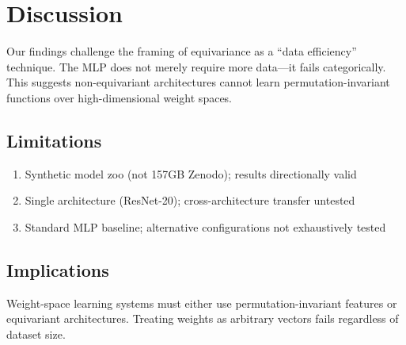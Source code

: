 \section{Discussion}

Our findings challenge the framing of equivariance as a ``data efficiency'' technique. The MLP does not merely require more data---it fails categorically. This suggests non-equivariant architectures cannot learn permutation-invariant functions over high-dimensional weight spaces.

\subsection{Limitations}

\begin{enumerate}
    \item Synthetic model zoo (not 157GB Zenodo); results directionally valid
    \item Single architecture (ResNet-20); cross-architecture transfer untested
    \item Standard MLP baseline; alternative configurations not exhaustively tested
\end{enumerate}

\subsection{Implications}

Weight-space learning systems must either use permutation-invariant features or equivariant architectures. Treating weights as arbitrary vectors fails regardless of dataset size.
